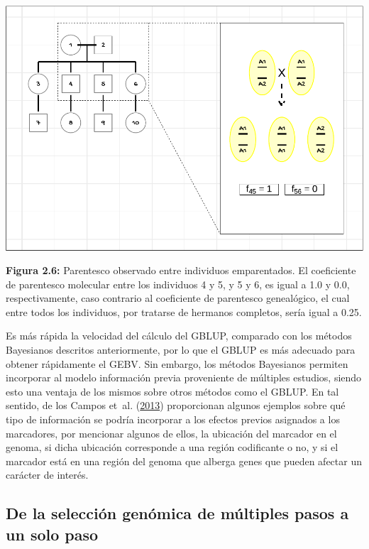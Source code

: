 \documentclass[11pt,spanish,a4paper,oneside,]{book} %
\begin{document}
\newpage

\begin{center}\includegraphics[width=1\linewidth]{figures/Ped} \end{center}

\noindent
\textbf{Figura 2.6:} Parentesco observado entre individuos emparentados. El coeficiente de parentesco molecular entre los individuos 4 y 5, y 5 y 6, es igual a 1.0 y 0.0, respectivamente, caso contrario al coeficiente de parentesco genealógico, el cual entre todos los individuos, por tratarse de hermanos completos, sería igual a 0.25.

Es más rápida la velocidad del cálculo del GBLUP, comparado con los métodos Bayesianos descritos anteriormente, por lo que el GBLUP es más adecuado para obtener rápidamente el GEBV. Sin embargo, los métodos Bayesianos permiten incorporar al modelo información previa proveniente de múltiples estudios, siendo esto una ventaja de los mismos sobre otros métodos como el GBLUP. En tal sentido, de los Campos et~al. (\protect\hyperlink{ref-cite:31}{2013}) proporcionan algunos ejemplos sobre qué tipo de información se podría incorporar a los efectos previos asignados a los marcadores, por mencionar algunos de ellos, la ubicación del marcador en el genoma, si dicha ubicación corresponde a una región codificante o no, y si el marcador está en una región del genoma que alberga genes que pueden afectar un carácter de interés.

\hypertarget{de-la-selecciuxf3n-genuxf3mica-de-muxfaltiples-pasos-a-un-solo-paso}{%
\subsection{De la selección genómica de múltiples pasos a un solo paso}\label{de-la-selecciuxf3n-genuxf3mica-de-muxfaltiples-pasos-a-un-solo-paso}}
\end{document}
